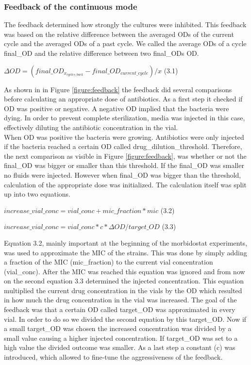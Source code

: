 \subsubsection{Feedback of the continuous mode} 
The feedback determined how strongly the cultures were inhibited. This feedback was based on the relative difference between the averaged ODs of the current cycle and the averaged ODs of a past cycle. We called the average ODs of a cycle final\_OD and the relative difference between two final\_ODs \textDelta OD. 
\begin{center}
	$\Delta OD = (final\_OD_{x_{cycles\_back}} - final\_OD_{current\_cycle})/x$ \quad (3.1) 
\end{center}
As shown in in Figure \ref{figure:feedback} the feedback did several comparisons before calculating an appropriate dose of antibiotics. As a first step it checked if \textDelta OD was positive or negative. A negative \textDelta OD implied that the bacteria were dying. In order to prevent complete sterilization, media was injected in this case, effectively diluting the antibiotic concentration in the vial. \\
When \textDelta OD was positive the bacteria were growing. Antibiotics were only injected if the bacteria reached a certain OD called drug\_dilution\_threshold. Therefore, the next comparison as visible in Figure \ref{figure:feedback}, was whether or not the final\_OD was bigger or smaller than this threshold. If the final\_OD was smaller no fluids were injected.
However when final\_OD was bigger than the threshold, calculation of the appropriate dose was initialized.
The calculation itself was split up into two equations.
\begin{center}
	$increase\_vial\_conc = vial\_conc + mic\_fraction*mic$ \quad (3.2) \label{eq:plus}
\end{center}
\begin{center}	
	$increase\_vial\_conc = vial\_conc * c * \Delta OD/target\_OD$ \quad (3.3) \label{eq:mult}
\end{center}
Equation 3.2, mainly important at the beginning of the morbidostat experiments, was used to approximate the MIC of the strains. This was done by simply adding a fraction of the MIC (mic\_fraction) to the current vial concentration (vial\_conc). After the MIC was reached this equation was ignored and from now on the second equation 3.3 determined the injected concentration. This equation multiplied the current drug concentration in the vials by the \textDelta OD which resulted in how much the drug concentration in the vial was increased.
The goal of the feedback was that a certain OD called target\_OD was approximated in every vial. In order to do so we divided the second equation by this target\_OD. Now if a small target\_OD was chosen the increased concentration was divided by a small value causing a higher injected concentration. If target\_OD was set to a high value the divided outcome was smaller. As a last step a constant (c) was introduced, which allowed to fine-tune the aggressiveness of the feedback.   

